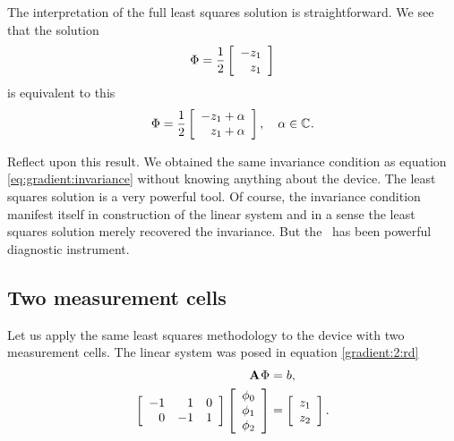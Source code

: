 The interpretation of the full least squares solution is straightforward. We see that the solution
\begin{equation}
  \Phi = \rtwo\mat{r}{-z_{1}\\z_{1}}
\end{equation}
is equivalent to this
\begin{equation}
  \Phi = \rtwo\mat{r}{-z_{1}+\alpha\\z_{1}+\alpha}, \quad \alpha \in \cmplx{}.
\end{equation}

Reflect upon this result. We obtained the same invariance condition as equation \eqref{eq:gradient:invariance} without knowing anything about the device. The least squares solution is a very powerful tool. Of course, the invariance condition manifest itself in construction of the linear system and in a sense the least squares solution merely recovered the invariance. But the \svdl \ has been powerful diagnostic instrument. 

\subsection{Two measurement cells}
Let us apply the same least squares methodology to the device with two measurement cells. The linear system was posed in equation \eqref{gradient:2:rd}
\begin{equation*}
  \begin{split}
    \A{}\Phi&=b,\\
    \mat{rrr}{-1&1&0\\0&-1&1}\mat{c}{\phi_{0}\\\phi_{1}\\\phi_{2}}&=\mat{c}{z_{1}\\z_{2}}.
  \end{split}
\end{equation*}


